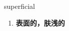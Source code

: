 
\begin{frame}
{\huge superficial}
\begin{center}
\begin{enumerate}\Large
  \item \textbf{表面的，肤浅的}
\end{enumerate}
\end{center}
\end{frame}
